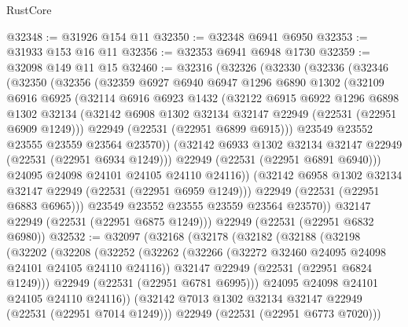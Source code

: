 \begin{lexlean}{RustCore}
\begin{coremodule}
@32348 := @31926 @154 @11
@32350 := @32348 @6941 @6950
@32353 := @31933 @153 @16 @11
@32356 := @32353 @6941 @6948 @1730
@32359 := @32098 @149 @11 @15
@32460 := @32316
    (@32326
      (@32330
        (@32336
          (@32346
            (@32350
              (@32356
                (@32359
                  @6927
                  @6940
                  @6947
                  @1296
                  @6890
                  @1302
                  (@32109
                    @6916
                    @6925
                    (@32114
                      @6916
                      @6923
                      @1432
                      (@32122
                        @6915
                        @6922
                        @1296
                        @6898
                        @1302
                        @32134
                        (@32142 @6908 @1302 @32134 @32147 @22949 (@22531 (@22951 @6909 @1249)))
                        @22949
                        (@22531 (@22951 @6899 @6915)))
                      @23549
                      @23552
                      @23555
                      @23559
                      @23564
                      @23570))
                  (@32142 @6933 @1302 @32134 @32147 @22949 (@22531 (@22951 @6934 @1249)))
                  @22949
                  (@22531 (@22951 @6891 @6940)))
                @24095
                @24098
                @24101
                @24105
                @24110
                @24116))
            (@32142 @6958 @1302 @32134 @32147 @22949 (@22531 (@22951 @6959 @1249)))
            @22949
            (@22531 (@22951 @6883 @6965)))
          @23549
          @23552
          @23555
          @23559
          @23564
          @23570))
      @32147
      @22949
      (@22531 (@22951 @6875 @1249)))
    @22949
    (@22531 (@22951 @6832 @6980))
@32532 := @32097
    (@32168
      (@32178
        (@32182
          (@32188
            (@32198
              (@32202
                (@32208
                  (@32252
                    (@32262
                      (@32266 (@32272 @32460 @24095 @24098 @24101 @24105 @24110 @24116))
                      @32147
                      @22949
                      (@22531 (@22951 @6824 @1249)))
                    @22949
                    (@22531 (@22951 @6781 @6995)))
                  @24095
                  @24098
                  @24101
                  @24105
                  @24110
                  @24116))
              (@32142 @7013 @1302 @32134 @32147 @22949 (@22531 (@22951 @7014 @1249)))
              @22949
              (@22531 (@22951 @6773 @7020)))

\end{coremodule}
\end{lexlean}
